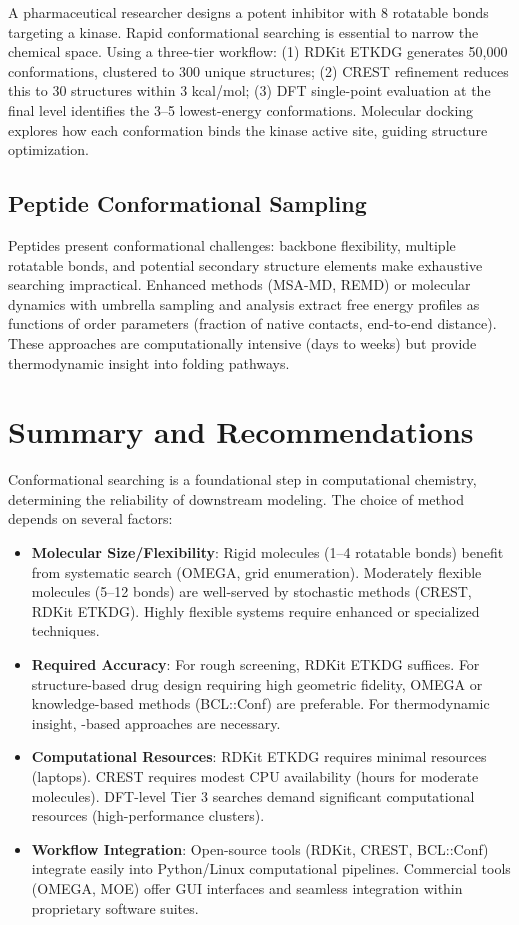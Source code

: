 \documentclass[12pt]{article}
\begin{document}
A pharmaceutical researcher designs a potent inhibitor with 8 rotatable bonds targeting a kinase. Rapid conformational searching is essential to narrow the chemical space. Using a three-tier workflow: (1) RDKit ETKDG generates 50,000 conformations, clustered to 300 unique structures; (2) CREST refinement reduces this to 30 structures within 3 kcal/mol; (3) DFT single-point evaluation at the final level identifies the 3--5 lowest-energy conformations. Molecular docking explores how each conformation binds the kinase active site, guiding structure optimization.

\subsection{Peptide Conformational Sampling}

Peptides present conformational challenges: backbone flexibility, multiple rotatable bonds, and potential secondary structure elements make exhaustive searching impractical. Enhanced \MD methods (MSA-MD, REMD) or molecular dynamics with umbrella sampling and \WHAM analysis extract free energy profiles as functions of order parameters (fraction of native contacts, end-to-end distance). These approaches are computationally intensive (days to weeks) but provide thermodynamic insight into folding pathways.

\section{Summary and Recommendations}

Conformational searching is a foundational step in computational chemistry, determining the reliability of downstream modeling. The choice of method depends on several factors:

\begin{itemize}
\item \textbf{Molecular Size/Flexibility}: Rigid molecules (1--4 rotatable bonds) benefit from systematic search (OMEGA, grid enumeration). Moderately flexible molecules (5--12 bonds) are well-served by stochastic methods (CREST, RDKit ETKDG). Highly flexible systems require enhanced \MD or specialized techniques.

\item \textbf{Required Accuracy}: For rough screening, RDKit ETKDG suffices. For structure-based drug design requiring high geometric fidelity, OMEGA or knowledge-based methods (BCL::Conf) are preferable. For thermodynamic insight, \MD-based approaches are necessary.

\item \textbf{Computational Resources}: RDKit ETKDG requires minimal resources (laptops). CREST requires modest CPU availability (hours for moderate molecules). DFT-level Tier 3 searches demand significant computational resources (high-performance clusters).

\item \textbf{Workflow Integration}: Open-source tools (RDKit, CREST, BCL::Conf) integrate easily into Python/Linux computational pipelines. Commercial tools (OMEGA, MOE) offer GUI interfaces and seamless integration within proprietary software suites.
\end{itemize}
\end{document}

